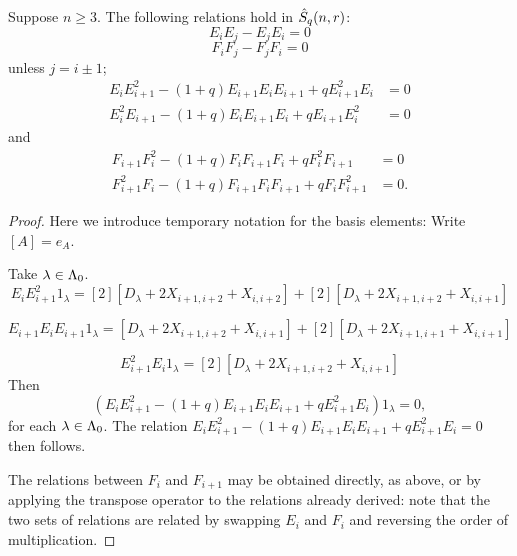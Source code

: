 \documentclass[a4paper, 11pt]{report}
\begin{document}
\begin{lemma}
Suppose $n\geq 3$. The following relations hold in $\hat{S}_q(n,r)$:
\begin{equation*}
E_i E_j - E_j E_i = 0
\end{equation*}
\begin{equation*}
F_i F_j - F_j F_i = 0
\end{equation*}
unless $j=i\pm 1$;
\begin{align*}
E_i E_{i+1}^2 - (1+q)E_{i+1} E_i E_{i+1} + qE_{i+1}^2 E_i &= 0\\
E_i^2 E_{i+1} - (1+q)E_i E_{i+1} E_i + qE_{i+1} E_i^2 &= 0
\end{align*}
and
\begin{align*}
F_{i+1} F_i^2 - (1+q) F_i F_{i+1} F_i + qF_i^2 F_{i+1} &=0\\
F_{i+1}^2 F_i - (1+q) F_{i+1} F_i F_{i+1} + q F_i F_{i+1}^2 &= 0.
\end{align*}
\end{lemma}
\begin{proof}
Here we introduce temporary notation for the basis elements: Write $[A] = e_A$.

Take $\lambda\in{\Lambda_0}$.
\begin{equation*}
E_i E_{i+1}^2 1_\lambda = [2][ {D_\lambda + 2X_{i+1,i+2} + X_{i,i+2} }] + [2][ { D_\lambda + 2X_{i+1,i+2} + X_{i,i+1} }]
\end{equation*}                                                                                                                                                                                                                                                                                                                                      

\begin{equation*}
E_{i+1} E_i E_{i+1} 1_\lambda = [ {D_\lambda + 2X_{i+1,i+2} + X_{i,i+1} } ] + [2][ { D_\lambda + 2X_{i+1,i+1} + X_{i,i+1} } ]
\end{equation*}

\begin{equation*}
E_{i+1}^2 E_i 1_\lambda = [2][ { D_\lambda + 2X_{i+1,i+2} + X_{i,i+1} } ]
\end{equation*}
Then
\begin{equation*}
(E_i E_{i+1}^2 - (1+q)E_{i+1} E_i E_{i+1} + qE_{i+1}^2 E_i)1_\lambda = 0,
\end{equation*}
for each $\lambda\in{\Lambda_0}$. The relation $E_i E_{i+1}^2 - (1+q)E_{i+1} E_i E_{i+1} + qE_{i+1}^2 E_i = 0$ then follows.


The relations between $F_i$ and $F_{i+1}$ may be obtained directly, as above, or by applying the transpose operator to the relations already derived: note that the two sets of relations are related by swapping $E_i$ and $F_i$ and reversing the order of multiplication.
\end{proof}
\end{document}
